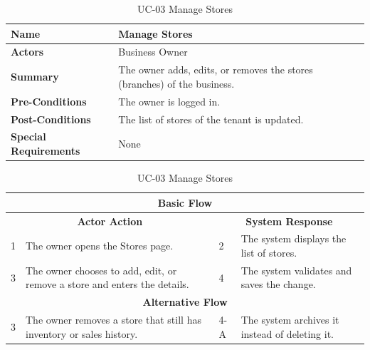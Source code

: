 \documentclass{StockSense}
\begin{document}
\begin{table}[!htbp]
\centering
\caption{UC-03 Manage Stores}
{\small\linespread{1}\selectfont
\begin{tabular}{|p{}|p{}|}
\hline
\textbf{Name} & Manage Stores \\ \hline
\textbf{Actors} & Business Owner \\ \hline
\textbf{Summary} & The owner adds, edits, or removes the stores (branches) of the business. \\ \hline
\textbf{Pre-Conditions} & The owner is logged in. \\ \hline
\textbf{Post-Conditions} & The list of stores of the tenant is updated. \\ \hline
\textbf{Special Requirements} & None \\ \hline
\end{tabular}\par\nointerlineskip
\begin{tabular}{|p{}|p{}|p{}|p{}|}
\multicolumn{4}{|c|}{\textbf{Basic Flow}} \\ \hline
\multicolumn{2}{|c|}{\textbf{Actor Action}} & \multicolumn{2}{c|}{\textbf{System Response}} \\ \hline
1 & The owner opens the Stores page. & 2 & The system displays the list of stores. \\ \hline
3 & The owner chooses to add, edit, or remove a store and enters the details. & 4 & The system validates and saves the change. \\ \hline
\multicolumn{4}{|c|}{\textbf{Alternative Flow}} \\ \hline
3 & The owner removes a store that still has inventory or sales history. & 4-A & The system archives it instead of deleting it. \\ \hline
\end{tabular}\par}
\end{table}
\end{document}
